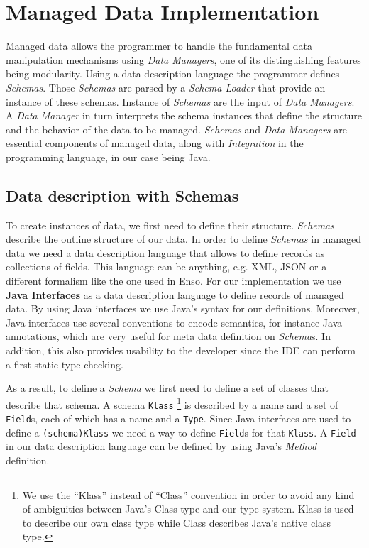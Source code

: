 \section{Managed Data Implementation}\label{sec:Managed Data Implementation}
Managed data allows the programmer to handle the fundamental data manipulation mechanisms using \textit{Data Managers}, one of its distinguishing features being modularity.
Using a data description language the programmer defines \textit{Schemas}.
Those \textit{Schemas} are parsed by a \textit{Schema Loader} that provide an instance of these schemas.
Instance of \textit{Schemas} are the input of \textit{Data Managers}. 
A \textit{Data Manager} in turn interprets the schema instances that define the structure and the behavior of the data to be managed.
\textit{Schemas} and \textit{Data Managers} are essential components of managed data, along with \textit{Integration} in the programming language, in our case being Java.

\subsection{Data description with Schemas}\label{Schema Definition}
To create instances of data, we first need to define their structure.
\textit{Schemas} describe the outline structure of our data.
In order to define \textit{Schemas} in managed data we need a data description language that allows to define records as collections of fields.
This language can be anything, e.g. XML, JSON or a different formalism like the one used in Enso.
For our implementation we use \textbf{Java Interfaces} as a data description language to define records of managed data.
By using Java interfaces we use Java's syntax for our definitions.
Moreover, Java interfaces use several conventions to encode semantics, for instance Java annotations, which are very useful for meta data definition on \textit{Schema}s.
In addition, this also provides usability to the developer since the IDE can perform a first static type checking.

As a result, to define a \textit{Schema} we first need to define a set of classes that describe that schema.
A schema \texttt{Klass} \footnote{
	We use the ``Klass'' instead of ``Class'' convention in order to avoid any kind of ambiguities between Java's Class type and our type system. Klass is used to describe our own class type while Class describes Java's native class type.} 
is described by a name and a set of \texttt{Field}s, each of which has a name and a \texttt{Type}.
Since Java interfaces are used to define a \texttt{(schema)Klass} we need a way to define \texttt{Field}s for that \texttt{Klass}.
A \texttt{Field} in our data description language can be defined by using Java's \textit{Method} definition.

